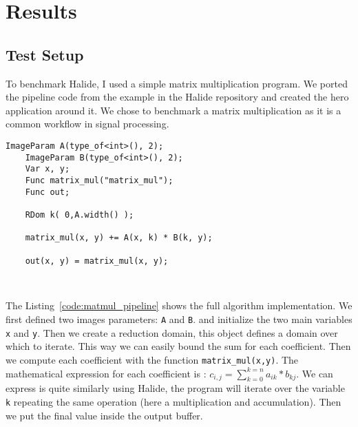 
\chapter{Results}
\section{Test Setup}
	To benchmark Halide, I used a simple matrix multiplication program.
	We ported the pipeline code from the example in the Halide repository and created the \gls{hero} application around it.
	We chose to benchmark a matrix multiplication as it is a common workflow in signal processing.

\lstset{basicstyle=\ttfamily\footnotesize,breaklines=true,tabsize=2}
\begin{lstlisting}[caption={Matrix Multiplication Pipeline.}, captionpos=b, label={code:matmul_pipeline}]
    ImageParam A(type_of<int>(), 2);
    ImageParam B(type_of<int>(), 2);
    Var x, y;
    Func matrix_mul("matrix_mul");
    Func out;

    RDom k( 0,A.width() );

    matrix_mul(x, y) += A(x, k) * B(k, y);

    out(x, y) = matrix_mul(x, y);



\end{lstlisting}

	The Listing~\ref{code:matmul_pipeline} shows the full algorithm implementation. We first defined two images parameters: \texttt{A} and \texttt{B}. and initialize the two main variables \texttt{x} and \texttt{y}.
	Then we create a reduction domain, this object defines a domain over which to iterate.
	This way we can  easily bound the sum for each coefficient. 
	Then we compute each coefficient with the function \texttt{matrix\_mul(x,y)}.
	The mathematical expression for each coefficient is : $c_{i,j} = \sum^{k=n}_{k=0} a_{ik}*b_{kj}$.
	We can express is quite similarly using Halide, the program will iterate over the variable \texttt{k} repeating the same operation (here a multiplication and accumulation).
	Then we put the final value inside the output buffer.
	
